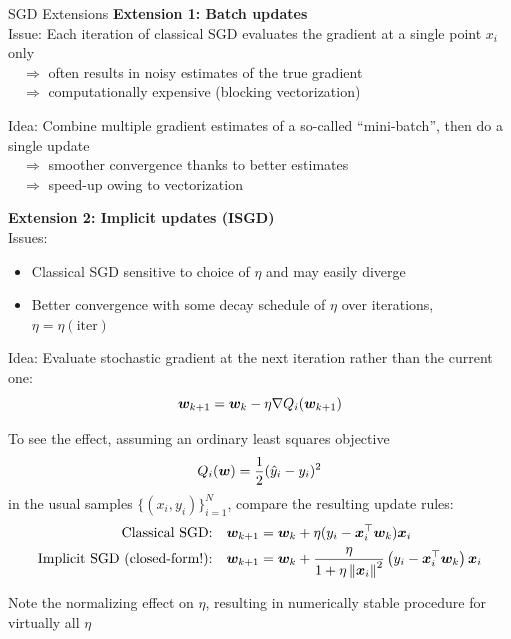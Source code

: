 \begin{frame}{SGD Extensions}
    \textbf{Extension 1: Batch updates} \\
    Issue: Each iteration of classical SGD evaluates the gradient at a single point $x_i$ only\\
    $\quad \Rightarrow $ often results in noisy estimates of the true gradient\\
    $\quad \Rightarrow $ computationally expensive (blocking vectorization)

    Idea: Combine multiple gradient estimates of a so-called ``mini-batch'', then do a single update\\
    $\quad \Rightarrow $ smoother convergence thanks to better estimates \\
    $\quad \Rightarrow $ speed-up owing to vectorization
\end{frame}

\begin{frame}
    \vspace*{5mm}
    \textbf{Extension 2: Implicit updates (ISGD)}\\

    Issues:
    \begin{itemize}
        \item Classical SGD sensitive to choice of $\eta$ and may easily diverge
        \item Better convergence with some decay schedule of $\eta$ over iterations, $\eta = \eta(\text{iter})$
    \end{itemize}

    Idea: Evaluate stochastic gradient at the next iteration rather than the current one:
    $$\bm{w}_{k + 1} = \bm{w}_k - \eta \nabla Q_i(\bm{w}_{k + 1})$$

    To see the effect, assuming an ordinary least squares objective
    $$Q_i(\bm{w}) = \frac12 (\hat y_i - y_i)^2$$
    in the usual samples $\{(x_i, y_i)\}_{i=1}^N$, compare the resulting update rules:
    \begin{align*}
        \text{Classical SGD:}               & \quad \bm{w}_{k + 1} = \bm{w}_k + \eta (y_i - \bm{x}_i^\top \bm{w}_k) \bm{x}_i \\
        \text{Implicit SGD (closed-form!):} & \quad \bm{w}_{k + 1} =
        \bm{w}_k + \frac{\eta}{1 + \eta \left\|\bm{x}_i\right\|^2} \left(y_i - \bm{x}_i^\top \bm{w}_k\right) \bm{x}_i
    \end{align*}

    Note the normalizing effect on $\eta$, resulting in numerically stable procedure for virtually all $\eta$
\end{frame}

